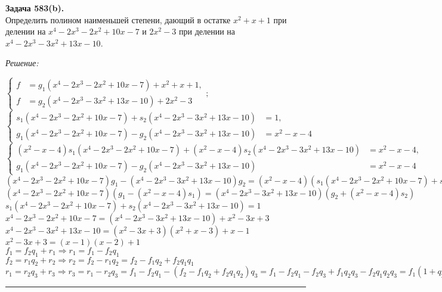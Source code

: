 \documentclass[a4paper, 12pt]{article}
\newenvironment{problem}[2][Задача]
    { \begin{mdframed}[backgroundcolor=gray!10] \textbf{#1 #2.} \\}
    {  \end{mdframed}}
\newenvironment{solution}
    {\textit{Решение: }}
    {\noindent\rule{7in}{1.5pt}}
\begin{document}
\begin{problem}{583(b)}
Определить полином наименьшей степени, дающий в остатке $x^2+x+1$ при делении на $x^4-2x^3-2x^2+10x-7$ и $2x^2-3$ при делении на $x^4-2x^3-3x^2+13x-10$.
\end{problem}
\begin{solution}

$
\left\{
\begin{aligned}
    f &= g_1(x^4-2x^3-2x^2+10x-7) + x^2+x+1,\\
    f &= g_2(x^4-2x^3-3x^2+13x-10) + 2x^2 - 3
\end{aligned}
\right.;
$
\\
$
\left\{
\begin{aligned}
    s_1(x^4-2x^3-2x^2+10x-7)+s_2(x^4-2x^3-3x^2+13x-10) &= 1,\\
    g_1(x^4-2x^3-2x^2+10x-7) - g_2(x^4-2x^3-3x^2+13x-10) &= x^2-x-4
\end{aligned}
\right.
$
\\
$
\left\{
\begin{aligned}
    (x^2-x-4)s_1(x^4-2x^3-2x^2+10x-7)+(x^2-x-4)s_2(x^4-2x^3-3x^2+13x-10) &= x^2-x-4,\\
    g_1(x^4-2x^3-2x^2+10x-7) - g_2(x^4-2x^3-3x^2+13x-10) &= x^2-x-4
\end{aligned}
\right.
$
\\
$\displaystyle (x^4-2x^3-2x^2+10x-7)g_1 - (x^4-2x^3-3x^2+13x-10)g_2 = (x^2-x-4)(s_1(x^4-2x^3-2x^2+10x-7)+s_2(x^4-2x^3-3x^2+13x-10))$
\\
$\displaystyle (x^4-2x^3-2x^2+10x-7)(g_1-(x^2-x-4)s_1) = (x^4-2x^3-3x^2+13x-10)(g_2+(x^2-x-4)s_2)$
\\
$\displaystyle s_1(x^4-2x^3-2x^2+10x-7)+s_2(x^4-2x^3-3x^2+13x-10) = 1$
\\
$\displaystyle x^4-2x^3-2x^2+10x-7 = (x^4-2x^3-3x^2+13x-10) + x^2 -3x + 3$
\\
$\displaystyle x^4-2x^3-3x^2+13x-10 = (x^2 -3x + 3)(x^2+x-3) + x - 1$
\\
$\displaystyle x^2-3x+3 = (x-1)(x-2)+1$
\\
$\displaystyle f_1 = f_2q_1 + r_1 \Rightarrow r_1 = f_1 - f_2q_1$
\\
$\displaystyle f_2 = r_1q_2 + r_2 \Rightarrow r_2 = f_2 - r_1q_2 = f_2 - f_1q_2 + f_2q_1q_1$
\\
$\displaystyle r_1 = r_2q_3 + r_3 \Rightarrow r_3 = r_1 - r_2q_3 = f_1 - f_2q_1 - (f_2 - f_1q_2 + f_2q_1q_2)q_3 = f_1 - f_2q_1 - f_2q_3 + f_1q_2q_3 - f_2q_1q_2q_3 = f_1(1 + q_2q_3) + f_2(-q_1-q_3-q_1q_2q_3)$

\end{solution}
\end{document}
